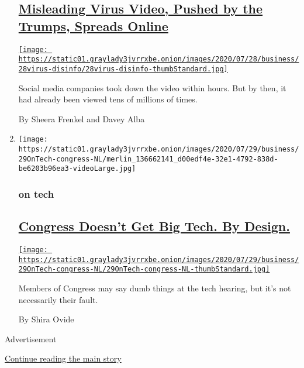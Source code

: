 \begin{enumerate}
  \hypertarget{misleading-virus-video-pushed-by-the-trumps-spreads-online}{%
  \subsection{\texorpdfstring{\href{/2020/07/28/technology/virus-video-trump.html}{Misleading
  Virus Video, Pushed by the Trumps, Spreads
  Online}}{Misleading Virus Video, Pushed by the Trumps, Spreads Online}}\label{misleading-virus-video-pushed-by-the-trumps-spreads-online}}

  \href{/2020/07/28/technology/virus-video-trump.html}{\texttt{[image: https://static01.graylady3jvrrxbe.onion/images/2020/07/28/business/28virus-disinfo/28virus-disinfo-thumbStandard.jpg]}}

  Social media companies took down the video within hours. But by then,
  it had already been viewed tens of millions of times.

  By Sheera Frenkel and Davey Alba
\item
  \texttt{[image: https://static01.graylady3jvrrxbe.onion/images/2020/07/29/business/29OnTech-congress-NL/merlin\_136662141\_d00edf4e-32e1-4792-838d-be6203b96ea3-videoLarge.jpg]}

  \hypertarget{on-tech}{%
  \subsubsection{on tech}\label{on-tech}}

  \hypertarget{congress-doesnt-get-big-tech-by-design}{%
  \subsection{\texorpdfstring{\href{/2020/07/29/technology/congress-big-tech.html}{Congress
  Doesn't Get Big Tech. By
  Design.}}{Congress Doesn't Get Big Tech. By Design.}}\label{congress-doesnt-get-big-tech-by-design}}

  \href{/2020/07/29/technology/congress-big-tech.html}{\texttt{[image: https://static01.graylady3jvrrxbe.onion/images/2020/07/29/business/29OnTech-congress-NL/29OnTech-congress-NL-thumbStandard.jpg]}}

  Members of Congress may say dumb things at the tech hearing, but it's
  not necessarily their fault.

  By Shira Ovide
\end{enumerate}

Advertisement

\protect\hyperlink{after-mid1}{Continue reading the main story}

